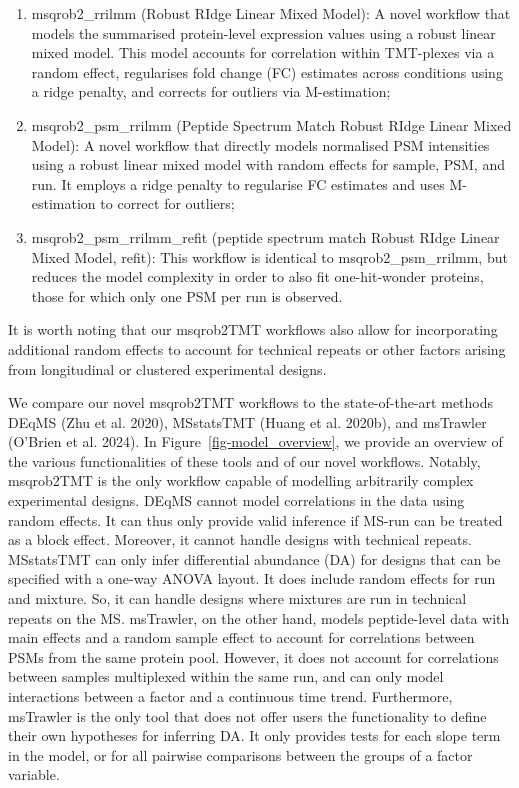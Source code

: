 \documentclass[
  letterpaper,
  DIV=11,
  numbers=noendperiod]{scrartcl}
\begin{document}
\begin{enumerate}
\def\labelenumi{\arabic{enumi}.}
\item
  msqrob2\_rrilmm (Robust RIdge Linear Mixed Model): A novel workflow
  that models the summarised protein-level expression values using a
  robust linear mixed model. This model accounts for correlation within
  TMT-plexes via a random effect, regularises fold change (FC) estimates
  across conditions using a ridge penalty, and corrects for outliers via
  M-estimation;
\item
  msqrob2\_psm\_rrilmm (Peptide Spectrum Match Robust RIdge Linear Mixed
  Model): A novel workflow that directly models normalised PSM
  intensities using a robust linear mixed model with random effects for
  sample, PSM, and run. It employs a ridge penalty to regularise FC
  estimates and uses M-estimation to correct for outliers;
\item
  msqrob2\_psm\_rrilmm\_refit (peptide spectrum match Robust RIdge
  Linear Mixed Model, refit): This workflow is identical to
  msqrob2\_psm\_rrilmm, but reduces the model complexity in order to
  also fit one-hit-wonder proteins, those for which only one PSM per run
  is observed.
\end{enumerate}

It is worth noting that our msqrob2TMT workflows also allow for
incorporating additional random effects to account for technical repeats
or other factors arising from longitudinal or clustered experimental
designs.

We compare our novel msqrob2TMT workflows to the state-of-the-art
methods DEqMS (Zhu et al. 2020), MSstatsTMT (Huang et al. 2020b), and
msTrawler (O'Brien et al. 2024). In Figure~\ref{fig-model_overview}, we
provide an overview of the various functionalities of these tools and of
our novel workflows. Notably, msqrob2TMT is the only workflow capable of
modelling arbitrarily complex experimental designs. DEqMS cannot model
correlations in the data using random effects. It can thus only provide
valid inference if MS-run can be treated as a block effect. Moreover, it
cannot handle designs with technical repeats. MSstatsTMT can only infer
differential abundance (DA) for designs that can be specified with a
one-way ANOVA layout. It does include random effects for run and
mixture. So, it can handle designs where mixtures are run in technical
repeats on the MS. msTrawler, on the other hand, models peptide-level
data with main effects and a random sample effect to account for
correlations between PSMs from the same protein pool. However, it does
not account for correlations between samples multiplexed within the same
run, and can only model interactions between a factor and a continuous
time trend. Furthermore, msTrawler is the only tool that does not offer
users the functionality to define their own hypotheses for inferring DA.
It only provides tests for each slope term in the model, or for all
pairwise comparisons between the groups of a factor variable.
\end{document}
